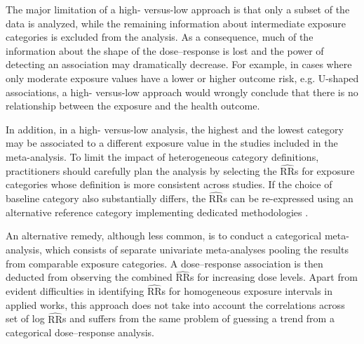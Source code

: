 \documentclass[11pt,a4paper,twoside,openany]{book}\usepackage{knitr}
\begin{document}
{{The major limitation of a high- versus-low approach is that only a subset of the data is analyzed, while the remaining information about intermediate exposure categories is excluded from the analysis. As a consequence, much of the information about the shape of the dose--response is lost and the power of detecting an association may dramatically decrease. For example, in cases where only moderate exposure values have a lower or higher outcome risk, e.g. U-shaped associations, a high- versus-low approach would wrongly conclude that there is no relationship between the exposure and the health outcome.

In addition, in a high- versus-low analysis, the highest and the lowest category may be associated to a different exposure value in the studies included in the meta-analysis. To limit the impact of heterogeneous category definitions, practitioners should carefully plan the analysis by selecting the $\widehat{\mathrm{RR}}$s for exposure categories whose definition is more consistent across studies. If the choice of baseline category also substantially differs, the $\widehat{\mathrm{RR}}$s can be re-expressed using an alternative reference category implementing dedicated methodologies \citep{hamling2008facilitating}.

An alternative remedy, although less common, is to conduct a categorical meta-analysis, which consists of separate univariate meta-analyses pooling the results from comparable exposure categories. A dose--response association is then deducted from observing the combined $\widehat{\mathrm{RR}}$s for increasing dose levels. Apart from evident difficulties in identifying $\widehat{\mathrm{RR}}$s for homogeneous exposure intervals in applied works, this approach does not take into account the correlations across set of log $\widehat{\mathrm{RR}}$s and suffers from the same problem of guessing a trend from a categorical dose--response analysis. 




}}
\end{document}
